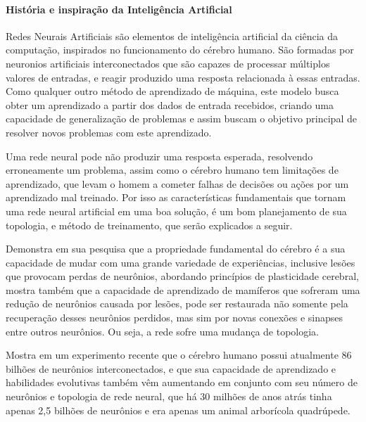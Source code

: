 \documentclass[	12pt, Times, openright, twoside, a4paper, english, brazil]{abntex2}
\begin{document}
          \paragraph*{História e inspiração da Inteligência Artificial}
            Redes Neurais Artificiais são elementos de inteligência artificial da ciência da computação, inspirados no funcionamento do cérebro humano.
            São formadas por neuronios artificiais interconectados que são capazes de processar múltiplos valores de entradas, e reagir produzido uma resposta relacionada à essas entradas.
            Como qualquer outro método de aprendizado de máquina, este modelo busca obter um aprendizado a partir dos dados de entrada recebidos, criando uma capacidade de generalização de problemas e assim buscam o objetivo principal de resolver novos problemas com este aprendizado.

            Uma rede neural pode não produzir uma resposta esperada, resolvendo erroneamente um problema, assim como o cérebro humano tem limitações de aprendizado, que levam o homem a cometer falhas de decisões ou ações por um aprendizado mal treinado. Por isso as características fundamentais que tornam uma rede neural artificial em uma boa solução, é um bom planejamento de sua topologia, e método de treinamento, que serão explicados a seguir.

            \cite{Muhammad2014} Demonstra em sua pesquisa que a propriedade fundamental do cérebro é a sua capacidade de mudar com uma grande variedade de experiências, inclusive lesões que provocam perdas de neurônios, abordando princípios de plasticidade cerebral, mostra também que a capacidade de aprendizado de mamíferos que sofreram uma redução de neurônios causada por lesões, pode ser restaurada não somente pela recuperação desses neurônios perdidos, mas sim por novas conexões e sinapses entre outros neurônios. Ou seja, a rede sofre uma mudança de topologia.

            \cite{Fapesp192} Mostra em um experimento recente que o cérebro humano possui atualmente 86 bilhões de neurônios interconectados, e que sua capacidade de aprendizado e habilidades evolutivas também vêm aumentando em conjunto com seu número de neurônios e topologia de rede neural, que há 30 milhões de anos atrás tinha apenas 2,5 bilhões de neurônios e era apenas um animal arborícola quadrúpede.
\end{document}
